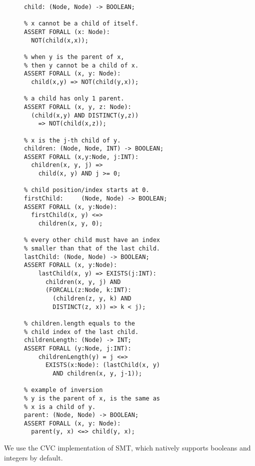 \begin{figure}
\begin{lstlisting}[caption=SMT functions for defining the children.length DOM operation.  We start with defining the parent-child relationships; then move on to the ordering of children; then use the child index of the last child to define and quantify the {\tt childrenLength()} boolean function,label=childrenLength]  
% child(x, y): x is a child of y.
child: (Node, Node) -> BOOLEAN;	

% x cannot be a child of itself.
ASSERT FORALL (x: Node):	
  NOT(child(x,x));
	
% when y is the parent of x,
% then y cannot be a child of x.  
ASSERT FORALL (x, y: Node):
  child(x,y) => NOT(child(y,x));
  
% a child has only 1 parent.
ASSERT FORALL (x, y, z: Node):
  (child(x,y) AND DISTINCT(y,z)) 
    => NOT(child(x,z));

% x is the j-th child of y.
children: (Node, Node, INT) -> BOOLEAN;
ASSERT FORALL (x,y:Node, j:INT): 
  children(x, y, j) => 
    child(x, y) AND j >= 0;

% child position/index starts at 0.
firstChild:		(Node, Node) -> BOOLEAN;
ASSERT FORALL (x, y:Node):
  firstChild(x, y) <=> 
    children(x, y, 0);

% every other child must have an index 
% smaller than that of the last child.
lastChild: (Node, Node) -> BOOLEAN;	
ASSERT FORALL (x, y:Node): 	
	lastChild(x, y) => EXISTS(j:INT): 
	  children(x, y, j) AND 
	  (FORCALL(z:Node, k:INT): 
	    (children(z, y, k) AND 
	    DISTINCT(z, x)) => k < j);

% children.length equals to the
% child index of the last child.
childrenLength:	(Node) -> INT;
ASSERT FORALL (y:Node, j:INT):
	childrenLength(y) = j <=> 
	  EXISTS(x:Node): (lastChild(x, y) 
	    AND children(x, y, j-1));

% example of inversion
% y is the parent of x, is the same as 
% x is a child of y.
parent: (Node, Node) -> BOOLEAN; 
ASSERT FORALL (x, y: Node): 
  parent(y, x) <=> child(y, x); 
\end{lstlisting} 
\end{figure}

We use the CVC implementation of SMT, which natively supports booleans and integers by default.  

